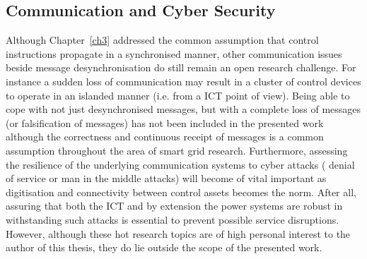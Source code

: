 \subsection{Communication and Cyber Security}

Although Chapter~\ref{ch3} addressed the common assumption that control instructions propagate in a synchronised manner, other communication issues beside message desynchronisation do still remain an open research challenge.
For instance a sudden loss of communication may result in a cluster of control devices to operate in an islanded manner (i.e. from a ICT point of view).
Being able to cope with not just desynchronised messages, but with a complete loss of messages (or falsification of messages) has not been included in the presented work although the correctness and continuous receipt of messages is a common assumption throughout the area of smart grid research.
Furthermore, assessing the resilience of the underlying communication systems to cyber attacks ( denial of service or man in the middle attacks) will become of vital important as digitisation and connectivity between control assets becomes the norm.
After all, assuring that both the ICT and by extension the power systems are robust in withstanding such attacks is essential to prevent possible service disruptions.
However, although these hot research topics are of high personal interest to the author of this thesis, they do lie outside the scope of the presented work.
